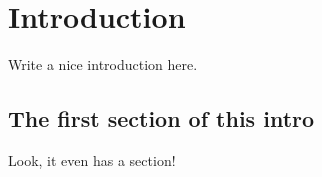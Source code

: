
\chapter{Introduction}

Write a nice introduction here.

\section{The first section of this intro}
Look, it even has a section!
